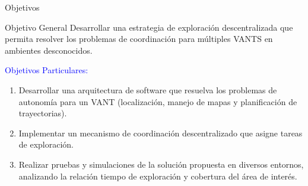 \documentclass[
  24pt, %
  aspectratio=169, %
]{beamer}
\begin{document}
\begin{frame}{Objetivos}
  \begin{block}{Objetivo General}
    Desarrollar una estrategia de exploración descentralizada que permita resolver los problemas de coordinación para múltiples VANTS en ambientes desconocidos.
  \end{block}
  \bigskip
  \textcolor{blue}{Objetivos Particulares:}\\
  \vspace{3mm}
  \begin{enumerate}
  \item Desarrollar una arquitectura de software que resuelva los problemas de autonomía para un VANT (localización, manejo de mapas y planificación de trayectorias).
  \item Implementar un mecanismo de coordinación descentralizado que asigne tareas de exploración.
  \item Realizar pruebas y simulaciones de la solución propuesta en diversos entornos, analizando la relación tiempo de exploración y cobertura del área de interés.
  \end{enumerate}
\end{frame}
\end{document}
